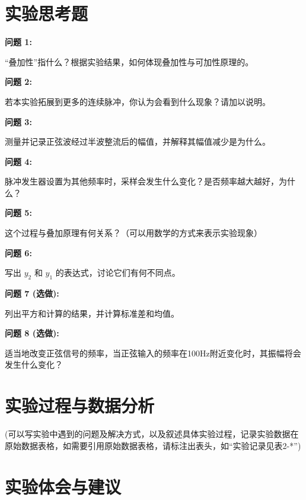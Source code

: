 \documentclass{sasreport}
\begin{document}
\section{实验思考题}
\textbf{问题 1:}

“叠加性”指什么？根据实验结果，如何体现叠加性与可加性原理的。

\textbf{问题 2:}

若本实验拓展到更多的连续脉冲，你认为会看到什么现象？请加以说明。

\textbf{问题 3:}

测量并记录正弦波经过半波整流后的幅值，并解释其幅值减少是为什么。

\textbf{问题 4:}

脉冲发生器设置为其他频率时，采样会发生什么变化？是否频率越大越好，为什么？

\textbf{问题 5:}

这个过程与叠加原理有何关系？（可以用数学的方式来表示实验现象）

\textbf{问题 6:}

写出 $y_2$ 和 $y_1$ 的表达式，讨论它们有何不同点。

\textbf{问题 7 (选做):}

列出平方和计算的结果，并计算标准差和均值。

\textbf{问题 8 (选做):}

适当地改变正弦信号的频率，当正弦输入的频率在100Hz附近变化时，其振幅将会发生什么变化？

\section{实验过程与数据分析}
 {\kaishu (可以写实验中遇到的问题及解决方式，以及叙述具体实验过程，记录实验数据在原始数据表格，如需要引用原始数据表格，请标注出表头，如“实验记录见表2-*”)}

\section{实验体会与建议}
\end{document}
